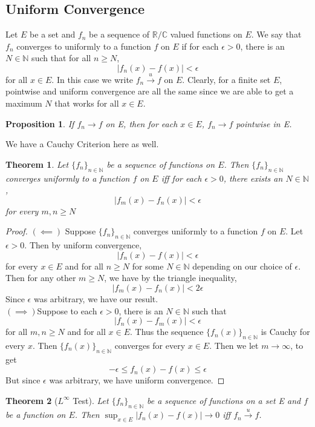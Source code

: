 \documentclass{article}
\newtheorem{theorem}{Theorem}
\newtheorem{proposition}{Proposition}
\begin{document}
\subsection*{Uniform Convergence}
Let $E$ be a set and $f_n$ be a sequence of $\mathbb{R}/\mathbb{C}$ valued functions on $E$. We say that $f_n$ converges to uniformly to a function $f$ on $E$ if for each $\epsilon>0$, there is an $N\in\mathbb{N}$ such that for all $n\geq N$, $$|f_n(x)-f(x)|<\epsilon$$
for all $x\in E$. In this case we write $f_n\xrightarrow{u} f$ on $E$. Clearly, for a finite set $E$, pointwise and uniform convergence are all the same since we are able to get a maximum $N$ that works for all $x\in E$.
\begin{proposition}
If $f_n\to f$ on E, then for each $x\in E$, $f_n\to f$ pointwise in E.
\end{proposition}
We have a Cauchy Criterion here as well.
\begin{theorem}
    Let $\{f_n\}_{n\in\mathbb{N}}$ be a sequence of functions on $E$. Then $\{f_n\}_{n\in\mathbb{N}}$ converges uniformly to a function $f$ on $E$ iff for each $\epsilon>0$, there exists an $N\in\mathbb{N}$, $$|f_m(x)-f_n(x)|<\epsilon$$ for every $m,n\geq N$
\end{theorem}
\begin{proof}
    $(\impliedby)$
    Suppose $\{f_n\}_{n\in\mathbb{N}}$ converges uniformly to a function $f$ on $E$. Let $\epsilon>0$. Then by uniform convergence, 
    $$|f_n(x)-f(x)|<\epsilon$$
    for every $x\in E$ and for all $n\geq N$ for some $N\in\mathbb{N}$ depending on our choice of $\epsilon$. Then for any other $m\geq N$, we have by the triangle inequality,
    $$|f_m(x)-f_n(x)|<2\epsilon$$
    Since $\epsilon$ was arbitrary, we have our result.\\
    $(\implies)$Suppose to each $\epsilon>0$, there is an $N\in\mathbb{N}$ such that $$|f_n(x)-f_m(x)|<\epsilon$$ for all $m,n\geq N$ and for all $x\in E$. Thus the sequence $\{f_n(x)\}_{n\in\mathbb{N}}$ is Cauchy for every $x$. Then $\{f_n(x)\}_{n\in\mathbb{N}}$ converges for every $x\in E$. Then we let $m\to\infty$, to get
    $$-\epsilon\leq f_n(x)-f(x)\leq\epsilon$$
    But since $\epsilon$ was arbitrary, we have uniform convergence.
\end{proof}
\begin{theorem}[$L^{\infty}$ Test]
    Let $\{f_n\}_{n\in\mathbb{N}}$ be a sequence of functions on a set E and $f$ be a function on $E$. Then $\sup_{x\in E}{|f_n(x)-f(x)|}\to 0$ iff $f_n\xrightarrow{u}f$.   
\end{theorem}
\end{document}
